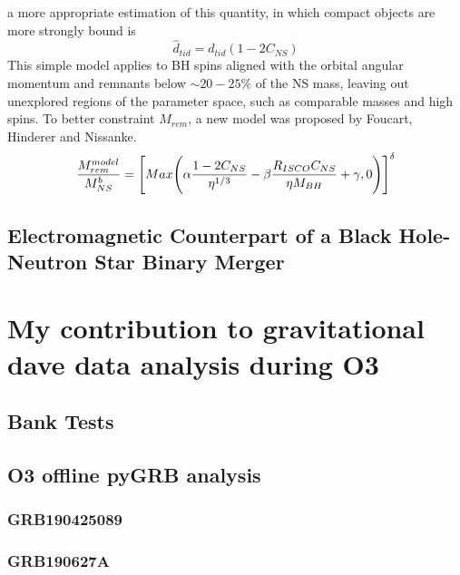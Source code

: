 \documentclass[binding=0.6cm, LaM]{sapthesis}
\begin{document}
        a more appropriate estimation of this quantity, in which compact objects are more strongly bound is
                \begin{equation}
                        \hat{d}_{tid} = d_{tid} (1 - 2C_{NS})
                \end{equation}
        This simple model applies to BH spins aligned with the orbital angular momentum and remnants below
        $\sim 20-25\%$ of the NS mass, leaving out unexplored regions of the parameter space,
        such as comparable masses and high spins.
        To better constraint $M_{rem}$, a new model was proposed by Foucart, Hinderer and Nissanke.
                \begin{equation}
                        {{M_{rem}^{model}} \over {M^b_{NS}}} = \Bigg[ Max \Bigg( \alpha{{1 - 2C_{NS}} \over {\eta^{1/3}}} - \beta {{R_{ISCO}C_{NS}} \over{\eta M_{BH}}} + \gamma, 0 \Bigg)\Bigg]^{\delta}
                \end{equation}



\section{Electromagnetic Counterpart of a Black Hole-Neutron Star Binary Merger}


\chapter{My contribution to gravitational dave data analysis during O3}

\section{Bank Tests}

\section{O3 offline pyGRB analysis}

\subsection{GRB190425089}

\subsection{GRB190627A}
\end{document}

